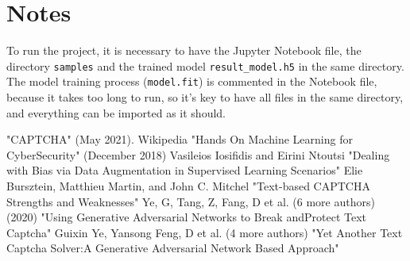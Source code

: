 \documentclass[conference]{IEEEtran}
\begin{document}
\section{Notes}
To run the project, it is necessary to have the Jupyter Notebook file, the directory \texttt{samples} and the trained model \texttt{result\_model.h5} in the same directory. The model training process (\texttt{model.fit}) is commented in the Notebook file, because it takes too long to run, so it's key to have all files in the same directory, and everything can be imported as it should. 
\begin{thebibliography}{00}
 "CAPTCHA" (May 2021). Wikipedia 
 "Hands On Machine Learning for CyberSecurity" (December 2018)
 Vasileios Iosifidis and Eirini Ntoutsi "Dealing with Bias via Data Augmentation in Supervised Learning Scenarios"
 Elie Bursztein, Matthieu Martin, and John C. Mitchel "Text-based CAPTCHA Strengths and Weaknesses"
 Ye, G, Tang, Z, Fang, D et al. (6 more authors) (2020) "Using Generative Adversarial Networks to Break andProtect Text Captcha"
 Guixin Ye, Yansong Feng, D et al. (4 more authors) "Yet Another Text Captcha Solver:A Generative Adversarial Network Based Approach"
\end{thebibliography}
\end{document}
